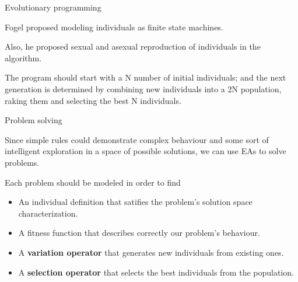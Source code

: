 \documentclass[10pt,dvipsnames]{beamer}
\begin{document}
  \begin{frame}{Evolutionary programming}
  \begin{blur}
    Fogel proposed modeling individuals as finite state machines.

    Also, he proposed sexual and asexual reproduction of individuals
    in the algorithm.

    The program should start with a N number of initial individuals;
    and the next generation is determined by combining new individuals
    into a 2N population, raking them and selecting the best N
    individuals.
  \end{blur}
  \end{frame}

  \begin{frame}{Problem solving}
  \begin{blur}
     {
        Since simple rules could demonstrate complex behaviour and some
        sort of intelligent exploration in a space of possible solutions,
        we can use EAs to solve problems.
    }

     {
      Each problem should be modeled in order to find
      \begin{itemize}
        \item An individual definition that satifies the problem's
        solution space characterization.
        \item A fitness function that describes correctly our problem's
        behaviour.
        \item A \textbf{variation operator} that generates new
        individuals from existing ones.
        \item A \textbf{selection operator} that selects the best
        individuals from the population.
      \end{itemize}
    }
  \end{blur}
  \end{frame}
\end{document}
